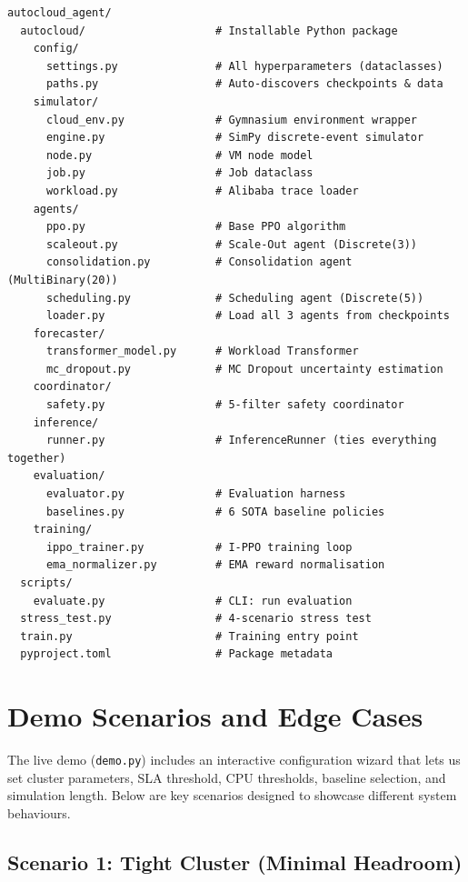 \documentclass[11pt,a4paper]{article}
\begin{document}
\begin{lstlisting}
autocloud_agent/
  autocloud/                    # Installable Python package
    config/
      settings.py               # All hyperparameters (dataclasses)
      paths.py                  # Auto-discovers checkpoints & data
    simulator/
      cloud_env.py              # Gymnasium environment wrapper
      engine.py                 # SimPy discrete-event simulator
      node.py                   # VM node model
      job.py                    # Job dataclass
      workload.py               # Alibaba trace loader
    agents/
      ppo.py                    # Base PPO algorithm
      scaleout.py               # Scale-Out agent (Discrete(3))
      consolidation.py          # Consolidation agent (MultiBinary(20))
      scheduling.py             # Scheduling agent (Discrete(5))
      loader.py                 # Load all 3 agents from checkpoints
    forecaster/
      transformer_model.py      # Workload Transformer
      mc_dropout.py             # MC Dropout uncertainty estimation
    coordinator/
      safety.py                 # 5-filter safety coordinator
    inference/
      runner.py                 # InferenceRunner (ties everything together)
    evaluation/
      evaluator.py              # Evaluation harness
      baselines.py              # 6 SOTA baseline policies
    training/
      ippo_trainer.py           # I-PPO training loop
      ema_normalizer.py         # EMA reward normalisation
  scripts/
    evaluate.py                 # CLI: run evaluation
  stress_test.py                # 4-scenario stress test
  train.py                      # Training entry point
  pyproject.toml                # Package metadata
\end{lstlisting}


\section{Demo Scenarios and Edge Cases}\label{sec:demo}


The live demo (\texttt{demo.py}) includes an interactive configuration wizard
that lets us set cluster parameters, SLA threshold, CPU thresholds, baseline
selection, and simulation length. Below are key scenarios designed to
showcase different system behaviours.

\subsection{Scenario 1: Tight Cluster (Minimal Headroom)}
\end{document}
